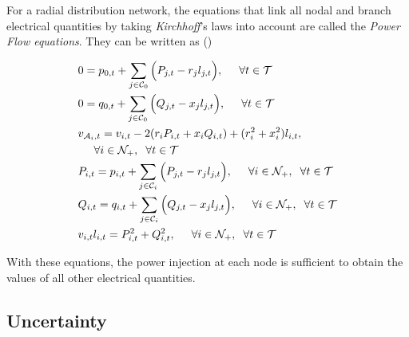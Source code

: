 For a radial distribution network, the equations that link all nodal and branch electrical quantities by taking \emph{Kirchhoff}'s laws into account are called the \emph{Power Flow equations}.
They can be written as (\cite{Farivar_Relax1})

\begin{align}
  & 0  =  p_{0,t} + \sum_{j\in \mathcal{C}_0} \Big(P_{j,t}-r_{j}l_{j,t} \Big), \hspace{0.5cm} \forall{t} \in \mathcal{T} \label{ACOPF1}\\
  & 0   =  q_{0,t} + \sum_{j\in \mathcal{C}_0} \Big( Q_{j,t}-x_{j}l_{j,t} \Big), \hspace{0.5cm} \forall{t} \in \mathcal{T} \label{ACOPF2}\\
  & v_{\mathcal{A}_i,t}  =   v_{i,t} -2(r_iP_{i,t} + x_iQ_{i,t}) + (r_i^2 + x_i^2)l_{i,t}, \\
  & \hspace{0.5cm} \forall i \in \mathcal{N}_{+}, \hspace{0.2cm} \forall{t} \in \mathcal{T} \label{ACOPF3}\\
  & P_{i,t} =  p_{i,t} + \sum_{j\in \mathcal{C}_i} \Big( P_{j,t}-r_{j}l_{j,t} \Big), \hspace{0.5cm} \forall i \in \mathcal{N}_{+}, \hspace{0.2cm} \forall{t} \in \mathcal{T} \label{ACOPF4}\\
  & Q_{i,t}  =  q_{i,t} + \sum_{j\in \mathcal{C}_i} \Big( Q_{j,t}-x_{j}l_{j,t} \Big), \hspace{0.5cm} \forall i \in \mathcal{N}_{+}, \hspace{0.2cm} \forall{t} \in \mathcal{T} \label{ACOPF5}\\
  & v_{i,t}l_{i,t} = P_{i,t}^2 + Q_{i,t}^2, \hspace{0.5cm} \forall i \in \mathcal{N}_{+}, \hspace{0.2cm} \forall{t} \in \mathcal{T} \label{ACOPF:quad}
\end{align}

With these equations, the power injection at each node is sufficient to obtain the values of all other electrical quantities.

\subsection{Uncertainty}

